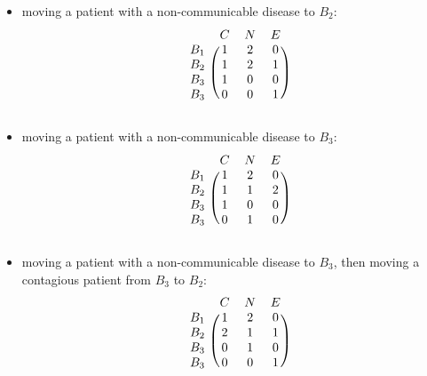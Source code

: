 \documentclass{article}
\begin{document}
\begin{itemize}
  \item moving a patient with a non-communicable disease to $B_2$:
  \begin{equation*}
  \begin{blockarray}{cccc}
  & C & N & E \\
  \begin{block}{c(ccc)}
  B_1 & 1 & 2 & 0 \\
  B_2 & 1 & 2 & 1 \\
  B_3 & 1 & 0 & 0 \\
  B_3 & 0 & 0 & 1 \\
  \end{block}
  \end{blockarray}
  \end{equation*}

  \item moving a patient with a non-communicable disease to $B_3$:
  \begin{equation*}
  \begin{blockarray}{cccc}
  & C & N & E \\
  \begin{block}{c(ccc)}
  B_1 & 1 & 2 & 0 \\
  B_2 & 1 & 1 & 2 \\
  B_3 & 1 & 0 & 0 \\
  B_3 & 0 & 1 & 0 \\
  \end{block}
  \end{blockarray}
  \end{equation*}

  \item moving a patient with a non-communicable disease to $B_3$, then moving a contagious patient from $B_3$ to $B_2$:
  \begin{equation*}
  \begin{blockarray}{cccc}
  & C & N & E \\
  \begin{block}{c(ccc)}
  B_1 & 1 & 2 & 0 \\
  B_2 & 2 & 1 & 1 \\
  B_3 & 0 & 1 & 0 \\
  B_3 & 0 & 0 & 1 \\
  \end{block}
  \end{blockarray}
  \end{equation*}


\end{itemize}
\end{document}
